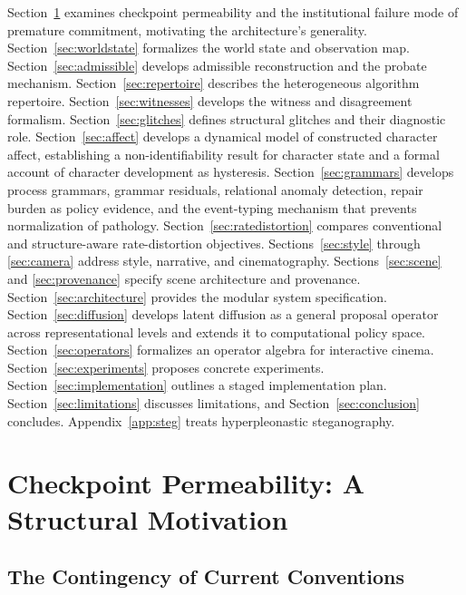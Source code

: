 \documentclass[11pt,a4paper]{article}
\theoremstyle{plain}
\theoremstyle{definition}
\theoremstyle{remark}
\begin{document}
Section~\ref{sec:motivation} examines checkpoint permeability and the institutional failure mode of premature commitment, motivating the architecture's generality. Section~\ref{sec:worldstate} formalizes the world state and observation map. Section~\ref{sec:admissible} develops admissible reconstruction and the probate mechanism. Section~\ref{sec:repertoire} describes the heterogeneous algorithm repertoire. Section~\ref{sec:witnesses} develops the witness and disagreement formalism. Section~\ref{sec:glitches} defines structural glitches and their diagnostic role. Section~\ref{sec:affect} develops a dynamical model of constructed character affect, establishing a non-identifiability result for character state and a formal account of character development as hysteresis. Section~\ref{sec:grammars} develops process grammars, grammar residuals, relational anomaly detection, repair burden as policy evidence, and the event-typing mechanism that prevents normalization of pathology. Section~\ref{sec:ratedistortion} compares conventional and structure-aware rate-distortion objectives. Sections~\ref{sec:style} through \ref{sec:camera} address style, narrative, and cinematography. Sections~\ref{sec:scene} and \ref{sec:provenance} specify scene architecture and provenance. Section~\ref{sec:architecture} provides the modular system specification. Section~\ref{sec:diffusion} develops latent diffusion as a general proposal operator across representational levels and extends it to computational policy space. Section~\ref{sec:operators} formalizes an operator algebra for interactive cinema. Section~\ref{sec:experiments} proposes concrete experiments. Section~\ref{sec:implementation} outlines a staged implementation plan. Section~\ref{sec:limitations} discusses limitations, and Section~\ref{sec:conclusion} concludes. Appendix~\ref{app:steg} treats hyperpleonastic steganography.

\section{Checkpoint Permeability: A Structural Motivation}
\label{sec:motivation}

\subsection{The Contingency of Current Conventions}
\end{document}
